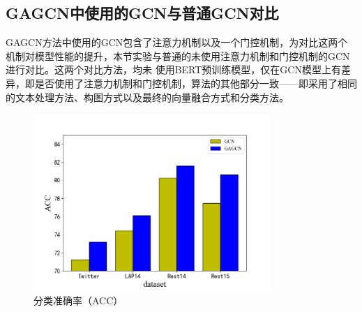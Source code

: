 \subsection{GAGCN中使用的GCN与普通GCN对比}
GAGCN方法中使用的GCN包含了注意力机制以及一个门控机制，为对比这两个机制对模型性能的提升，本节实验与普通的未使用注意力机制和门控机制的GCN进行对比。这两个对比方法，均未
使用BERT预训练模型，仅在GCN模型上有差异，即是否使用了注意力机制和门控机制，算法的其他部分一致——即采用了相同的文本处理方法、构图方式以及最终的向量融合方式和分类方法。

\begin{figure}[htb]
    \setlength{\belowcaptionskip}{0pt}
    \centering
    \includegraphics[width=0.8\textwidth]{pic/gcn-gagcnAcc.png}
    \caption{分类准确率（ACC）}
    \label{gcn_gagcn_acc}
\end{figure}

